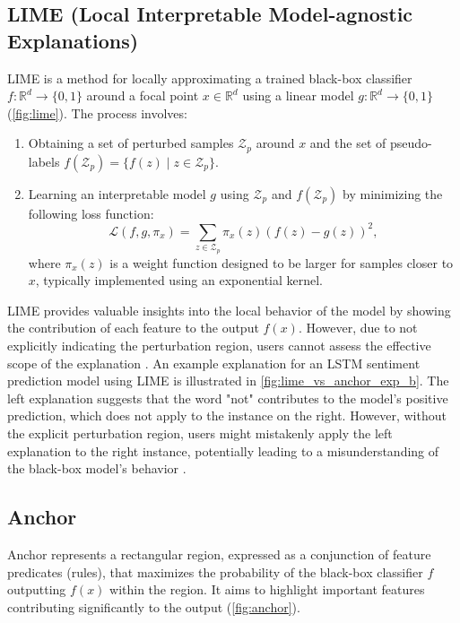 \documentclass[runningheads]{llncs}
\begin{document}
\subsection{LIME (Local Interpretable Model-agnostic Explanations) \cite{ribeiro2016why}}
LIME is a method for locally approximating a trained black-box classifier $f: \mathbb{R}^d \to \{0,1\}$ around a focal point $x \in \mathbb{R}^d$ using a linear model $g: \mathbb{R}^d \to \{0,1\}$ (\cref{fig:lime}). The process involves:
\begin{enumerate}
  \item Obtaining a set of perturbed samples $\mathcal{Z}_p$ around $x$ and the set of pseudo-labels $f(\mathcal{Z}_p) = \{f(z) \mid z \in \mathcal{Z}_p\}$.
  \item Learning an interpretable model $g$ using $\mathcal{Z}_p$ and $f(\mathcal{Z}_p)$ by minimizing the following loss function:
        \begin{equation}
          \label{eq:lime_loss}
          \mathcal{L}(f,g,\pi_x)=\sum_{z\in\mathcal{Z}_p}
          \pi_x(z){\left(f(z)-g(z)\right)}^2,
        \end{equation}
        where $\pi_x(z)$ is a weight function designed to be larger for samples closer to $x$, typically implemented using an exponential kernel.
\end{enumerate}

LIME provides valuable insights into the local behavior of the model by showing the contribution of each feature to the output $f(x)$. However, due to not explicitly indicating the perturbation region, users cannot assess the effective scope of the explanation \cite{ribeiro2018anchors}. An example explanation for an LSTM sentiment prediction model using LIME is illustrated in \cref{fig:lime_vs_anchor_exp_b}. The left explanation suggests that the word "not" contributes to the model's positive prediction, which does not apply to the instance on the right. However, without the explicit perturbation region, users might mistakenly apply the left explanation to the right instance, potentially leading to a misunderstanding of the black-box model's behavior \cite{ribeiro2018anchors}.

\subsection{Anchor \cite{ribeiro2018anchors}}\label{sec:anchor}
Anchor represents a rectangular region,
expressed as a conjunction of feature predicates (rules),
that maximizes the probability of the black-box classifier $f$ outputting $f(x)$ within the region. It aims to highlight important features contributing significantly to the output (\cref{fig:anchor}).
\end{document}
